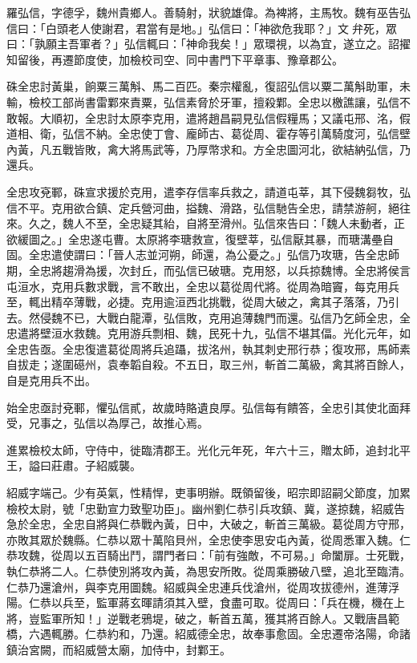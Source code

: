 \begin{pinyinscope}
 羅弘信，字德孚，魏州貴鄉人。善騎射，狀貌雄偉。為裨將，主馬牧。魏有巫告弘信曰：「白頭老人使謝君，君當有是地。」弘信曰：「神欲危我耶？」文弁死，眾曰：「孰願主吾軍者？」弘信輒曰：「神命我矣！」眾環視，以為宜，遂立之。詔擢知留後，再遷節度使，加檢校司空、同中書門下平章事、豫章郡公。



 硃全忠討黃巢，餉粟三萬斛、馬二百匹。秦宗權亂，復詔弘信以粟二萬斛助軍，未輸，檢校工部尚書雷鄴來責粟，弘信素脅於牙軍，擅殺鄴。全忠以檄譙讓，弘信不敢報。大順初，全忠討太原李克用，遣將趙昌嗣見弘信假糧馬；又議屯邢、洺，假道相、衛，弘信不納。全忠使丁會、龐師古、葛從周、霍存等引萬騎度河，弘信壁內黃，凡五戰皆敗，禽大將馬武等，乃厚幣求和。方全忠圖河北，欲結納弘信，乃還兵。



 全忠攻兗鄆，硃宣求援於克用，遣李存信率兵救之，請道屯莘，其下侵魏芻牧，弘信不平。克用欲合鎮、定兵營河曲，搤魏、滑路，弘信馳告全忠，請禁游舸，絕往來。久之，魏人不至，全忠疑其紿，自將至滑州。弘信來告曰：「魏人未動者，正欲緩圖之。」全忠遂屯曹。太原將李瑭救宣，復壁莘，弘信厭其暴，而瑭溝壘自固。全忠遣使謂曰：「晉人志並河朔，師還，為公憂之。」弘信乃攻瑭，告全忠師期，全忠將趨滑為援，次封丘，而弘信已破瑭。克用怒，以兵掠魏博。全忠將侯言屯洹水，克用兵數求戰，言不敢出，全忠以葛從周代將。從周為暗竇，每克用兵至，輒出精卒薄戰，必捷。克用逾洹西北挑戰，從周大破之，禽其子落落，乃引去。然侵魏不已，大戰白龍潭，弘信敗，克用追薄魏門而還。弘信乃乞師全忠，全忠遣將壁洹水救魏。克用游兵剽相、魏，民死十九，弘信不堪其偪。光化元年，如全忠告亟。全忠復遣葛從周將兵追躡，拔洺州，執其刺史邢行恭；復攻邢，馬師素自拔走；遂圍礠州，袁奉韜自殺。不五日，取三州，斬首二萬級，禽其將百餘人，自是克用兵不出。



 始全忠亟討兗鄆，懼弘信貳，故歲時賂遺良厚。弘信每有饋答，全忠引其使北面拜受，兄事之，弘信以為厚己，故推心焉。



 進累檢校太師，守侍中，徙臨清郡王。光化元年死，年六十三，贈太師，追封北平王，謚曰莊肅。子紹威襲。



 紹威字端己。少有英氣，性精悍，吏事明辦。既領留後，昭宗即詔嗣父節度，加累檢校太尉，號「忠勤宣力致聖功臣」。幽州劉仁恭引兵攻鎮、冀，遂掠魏，紹威告急於全忠，全忠自將與仁恭戰內黃，日中，大破之，斬首三萬級。葛從周方守邢，亦敗其眾於魏縣。仁恭以眾十萬陷貝州，全忠使李思安屯內黃，從周悉軍入魏。仁恭攻魏，從周以五百騎出鬥，謂門者曰：「前有強敵，不可易。」命闔扉。士死戰，執仁恭將二人。仁恭使別將攻內黃，為思安所敗。從周乘勝破八壁，追北至臨清。仁恭乃還滄州，與李克用圖魏。紹威與全忠連兵伐滄州，從周攻拔德州，進薄浮陽。仁恭以兵至，監軍蔣玄暉請須其入壁，食盡可取。從周曰：「兵在機，機在上將，豈監軍所知！」逆戰老鴉堤，破之，斬首五萬，獲其將百餘人。又戰唐昌範橋，六遇輒勝。仁恭約和，乃還。紹威德全忠，故奉事愈固。全忠遷帝洛陽，命諸鎮治宮闕，而紹威營太廟，加侍中，封鄴王。




\end{pinyinscope}
